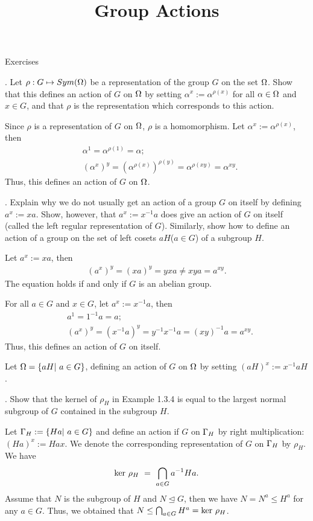 \documentclass[12pt]{amsart}
\def\a{\alpha} \def\b{\beta} \def\g{\gamma} \def\d{\delta} \def\e{\varepsilon}
\def\r{\rho} \def\o{\sigma} \def\t{\tau} \def\w{\omega} \def\k{\kappa}
\def\m{\medskip} \def\l{\noindent} \def\x{$\!\,$} \def\J{$-\!\,$}
\def\pf{\noindent {\it Proof.\ }}
\begin{document}
\title[Group Actions]
{Group Actions}%
\maketitle

\l Exercises

\l 1. Let $\r: G\mapsto Sym(\O)$ be a representation of the group $G$ on the set $\Omega$. Show that this defines an action of $G$ on $\Omega$ by setting $\a^x:=\a^{\r(x)}$ for all $\a\in \O$ and $x\in G$, and that $\r$ is the representation which corresponds to this action.
\m

\pf Since $\r$ is a representation of $G$ on $\Omega$, $\r$ is a homomorphism. Let $\a^x:=\a^{\r(x)}$, then
\begin{align*}
 &\a^1=\a^{\r(1)}=\a;\\
 &(\a^x)^y=(\a^{\r(x)})^{\r(y)}=\a^{\r(xy)}=\a^{xy}.
\end{align*}
Thus, this defines an action of $G$ on $\Omega$.

\m
\m

\l 2. Explain why we do not usually get an action of a group $G$ on itself by defining $a^x:=xa$. Show, however, that $a^x:=x^{-1}a$ does give an action of $G$ on itself (called the left regular representation of $G$). Similarly, show how to define an action of a group on the set of left cosets $aH$($a\in G$) of a subgroup $H$.
\m

\pf Let $a^x:=xa$, then
\begin{align*}
 (a^x)^y=(xa)^y=yxa \neq xya=a^{xy}.
\end{align*}
The equation holds if and only if $G$ is an abelian group.

For all $a\in G$ and $x\in G$, let $a^x:=x^{-1}a$, then
\begin{align*}
 &a^1=1^{-1}a=a;\\
 &(a^x)^y=(x^{-1}a)^{y}=y^{-1}x^{-1}a=(xy)^{-1}a=a^{xy}.
\end{align*}
Thus, this defines an action of $G$ on itself.

Let $\Omega=\{aH|\ a\in G\}$, defining an action of $G$ on $\Omega$ by setting $(aH)^x:=x^{-1}aH$.

\m
\m

\l 3. Show that the kernel of $\r_H$ in Example 1.3.4 is equal to the largest normal subgroup of $G$ contained in the subgroup $H$.
\m

\pf Let $\Gamma_H:=\{Ha|\ a\in G\}$ and define an action if $G$ on $\Gamma_H$ by right multiplication: $(Ha)^x:=Hax$. We denote the corresponding representation of $G$ on $\Gamma_H$ by $\r_H$. We have
\begin{align*}
 {\rm ker}\ \r_H\ =\ \bigcap_{a\in G}a^{-1}Ha.
\end{align*}
Assume that $N$ is the subgroup of $H$ and $N\unlhd G$, then we have $N=N^a\le H^a$ for any $a\in G$. Thus, we obtained that $N\le \bigcap_{a\in G}H^a={\rm ker}\ \r_H$.
\end{document}
